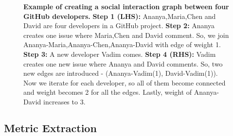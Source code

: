 \documentclass[sigconf,review]{acmart}
\begin{document}
\begin{figure}
\caption{\textbf{Example of creating a social interaction graph between four GitHub developers.}
\textbf{Step 1 (LHS):} Ananya,Maria,Chen and David are four developers in a GitHub project. \textbf{Step 2:} Ananya creates one issue where Maria,Chen and David comment. So, we join Ananya-Maria,Ananya-Chen,Ananya-David with edge of weight 1. \textbf{Step 3:} A new developer Vadim comes. \textbf{Step 4 (RHS):} Vadim creates one new issue where Ananya and David comments. So, two new edges are introduced - (Ananya-Vadim(1), David-Vadim(1)).  Now we iterate for each developer, so all of them become connected and weight becomes 2 for all the edges. Lastly,  weight of Ananya-David increases to 3.}
\label{fig:social_interaction_graph}       
\end{figure}





\subsection{Metric Extraction}
\label{sec:Experimental Setup}
\end{document}
